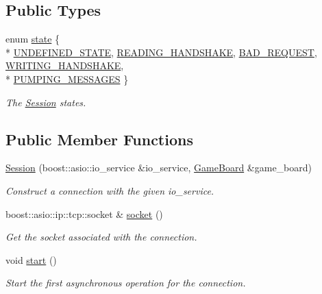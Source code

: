 \subsection*{Public Types}
\begin{DoxyCompactItemize}
\item 
enum \hyperlink{classwebsocket_1_1Session_a643e11bb9d05b580f20ff232f3582c1b}{state} \{ \\*
\hyperlink{classwebsocket_1_1Session_a643e11bb9d05b580f20ff232f3582c1baea725805737e434c2b1d0b061df4ddde}{U\+N\+D\+E\+F\+I\+N\+E\+D\+\_\+\+S\+T\+A\+TE}, 
\hyperlink{classwebsocket_1_1Session_a643e11bb9d05b580f20ff232f3582c1ba3b14b5a3d2ab8b61422448f7464a5d4a}{R\+E\+A\+D\+I\+N\+G\+\_\+\+H\+A\+N\+D\+S\+H\+A\+KE}, 
\hyperlink{classwebsocket_1_1Session_a643e11bb9d05b580f20ff232f3582c1ba057f3e49a1f4623a6011d712c1cbc7ba}{B\+A\+D\+\_\+\+R\+E\+Q\+U\+E\+ST}, 
\hyperlink{classwebsocket_1_1Session_a643e11bb9d05b580f20ff232f3582c1ba272f56d02b3f719d25d23ebe3f68f44a}{W\+R\+I\+T\+I\+N\+G\+\_\+\+H\+A\+N\+D\+S\+H\+A\+KE}, 
\\*
\hyperlink{classwebsocket_1_1Session_a643e11bb9d05b580f20ff232f3582c1baba12c4de6ae83a4f63b1c700d4ecfe8e}{P\+U\+M\+P\+I\+N\+G\+\_\+\+M\+E\+S\+S\+A\+G\+ES}
 \}\begin{DoxyCompactList}\small\item\em The \hyperlink{classwebsocket_1_1Session}{Session} states. \end{DoxyCompactList}
\end{DoxyCompactItemize}
\subsection*{Public Member Functions}
\begin{DoxyCompactItemize}
\item 
\hyperlink{classwebsocket_1_1Session_ac24bab7092bff9d7a6deaa6b94e73a87}{Session} (boost\+::asio\+::io\+\_\+service \&io\+\_\+service, \hyperlink{classwebsocket_1_1GameBoard}{Game\+Board} \&game\+\_\+board)
\begin{DoxyCompactList}\small\item\em Construct a connection with the given io\+\_\+service. \end{DoxyCompactList}\item 
boost\+::asio\+::ip\+::tcp\+::socket \& \hyperlink{classwebsocket_1_1Session_a0c5a4e7b9ca4c0e01a55c4c528470a76}{socket} ()
\begin{DoxyCompactList}\small\item\em Get the socket associated with the connection. \end{DoxyCompactList}\item 
void \hyperlink{classwebsocket_1_1Session_a0d9852b26f06d0860e9535b2e36b7d88}{start} ()
\begin{DoxyCompactList}\small\item\em Start the first asynchronous operation for the connection. \end{DoxyCompactList}\end{DoxyCompactItemize}
